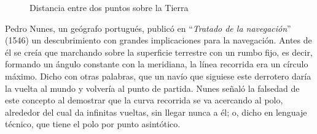 \begin{figure}[!h]
	\caption{Distancia entre dos puntos sobre la Tierra}
\end{figure}

Pedro Nunes, un geógrafo portugués, publicó en ``\emph{Tratado de la navegaci\'on}'' (1546) un descubrimiento con grandes implicaciones para la navegación. Antes de él se creía que marchando sobre la superficie terrestre con un rumbo fijo, es decir, formando un ángulo constante con la meridiana, la línea recorrida era un círculo máximo. Dicho con otras palabras, que un navío que siguiese este derrotero daría la vuelta al mundo y volvería al punto de partida. Nunes señaló la falsedad de este concepto al demostrar que la curva recorrida se va acercando al polo, alrededor del cual da infinitas vueltas, sin llegar nunca a él; o, dicho en lenguaje técnico, que tiene el polo por punto asintótico.

